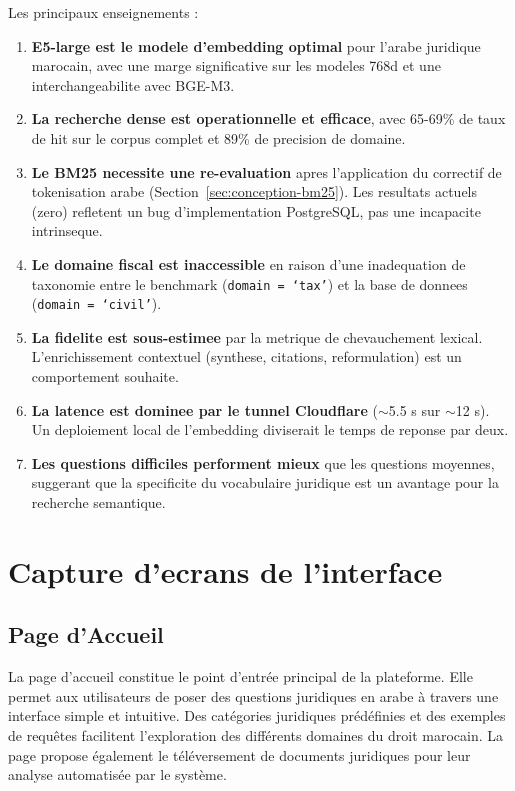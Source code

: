 Les principaux enseignements :

\begin{enumerate}
    \item \textbf{E5-large est le modele d'embedding optimal} pour l'arabe juridique marocain, avec une marge significative sur les modeles 768d et une interchangeabilite avec BGE-M3.

    \item \textbf{La recherche dense est operationnelle et efficace}, avec 65-69\% de taux de hit sur le corpus complet et 89\% de precision de domaine.

    \item \textbf{Le BM25 necessite une re-evaluation} apres l'application du correctif de tokenisation arabe (Section~\ref{sec:conception-bm25}). Les resultats actuels (zero) refletent un bug d'implementation PostgreSQL, pas une incapacite intrinseque.

    \item \textbf{Le domaine fiscal est inaccessible} en raison d'une inadequation de taxonomie entre le benchmark (\texttt{domain = `tax'}) et la base de donnees (\texttt{domain = `civil'}).

    \item \textbf{La fidelite est sous-estimee} par la metrique de chevauchement lexical. L'enrichissement contextuel (synthese, citations, reformulation) est un comportement souhaite.

    \item \textbf{La latence est dominee par le tunnel Cloudflare} ($\sim$5.5 s sur $\sim$12 s). Un deploiement local de l'embedding diviserait le temps de reponse par deux.

    \item \textbf{Les questions difficiles performent mieux} que les questions moyennes, suggerant que la specificite du vocabulaire juridique est un avantage pour la recherche semantique.
\end{enumerate}


\section{Capture d'ecrans de l'interface}

\subsection{Page d'Accueil}

La page d'accueil constitue le point d'entrée principal de la plateforme. Elle permet aux utilisateurs de poser des questions juridiques en arabe à travers une interface simple et intuitive. Des catégories juridiques prédéfinies et des exemples de requêtes facilitent l'exploration des différents domaines du droit marocain. La page propose également le téléversement de documents juridiques pour leur analyse automatisée par le système.

